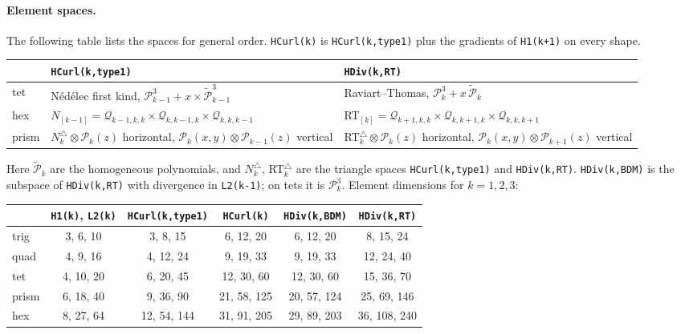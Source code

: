 \documentclass[10pt,a4paper]{article}
\newcommand{\code}[1]{\texttt{#1}}
\newcommand{\Pp}{\mathcal P}\newcommand{\Qq}{\mathcal Q}
\begin{document}
\paragraph{Element spaces.}
The following table lists the spaces for general order. \code{HCurl(k)} is \code{HCurl(k,type1)} plus the gradients of \code{H1(k+1)} on every shape.
\begin{center}\small
\renewcommand{\arraystretch}{1.15}
\begin{tabular}{@{}l>{\raggedright}p{7.0cm}>{\raggedright\arraybackslash}p{8.0cm}@{}}\toprule
 & \code{HCurl(k,type1)} & \code{HDiv(k,RT)}\\\midrule
tet & N\'ed\'elec first kind, $\Pp_{k-1}^3 + x\times\tilde{\Pp}_{k-1}^3$ & Raviart--Thomas, $\Pp_k^3+x\,\tilde{\Pp}_k$\\
hex & $N_{[k-1]} = \Qq_{k-1,k,k}\times\Qq_{k,k-1,k}\times\Qq_{k,k,k-1}$ & RT$_{[k]}=\Qq_{k+1,k,k}\times\Qq_{k,k+1,k}\times\Qq_{k,k,k+1}$\\
prism & $N^{\triangle}_k\otimes\Pp_k(z)$ horizontal, $\Pp_k(x,y)\otimes\Pp_{k-1}(z)$ vertical & RT$^{\triangle}_k\otimes\Pp_k(z)$ horizontal, $\Pp_k(x,y)\otimes\Pp_{k+1}(z)$ vertical\\\bottomrule
\end{tabular}
\end{center}
Here $\tilde{\Pp}_k$ are the homogeneous polynomials, and $N^\triangle_k$, RT$^\triangle_k$ are the triangle spaces \code{HCurl(k,type1)} and \code{HDiv(k,RT)}.
\code{HDiv(k,BDM)} is the subspace of \code{HDiv(k,RT)} with divergence in \code{L2(k-1)}; on tets it is $\Pp_k^3$.
Element dimensions for $k=1,2,3$:
\begin{center}\small
\begin{tabular}{@{}lccccc@{}}\toprule
 & \code{H1(k)}, \code{L2(k)} & \code{HCurl(k,type1)} & \code{HCurl(k)} & \code{HDiv(k,BDM)} & \code{HDiv(k,RT)}\\\midrule
trig  & 3, 6, 10  & 3, 8, 15   & 6, 12, 20   & 6, 12, 20   & 8, 15, 24\\
quad  & 4, 9, 16  & 4, 12, 24  & 9, 19, 33   & 9, 19, 33   & 12, 24, 40\\
tet   & 4, 10, 20 & 6, 20, 45  & 12, 30, 60  & 12, 30, 60  & 15, 36, 70\\
prism & 6, 18, 40 & 9, 36, 90  & 21, 58, 125 & 20, 57, 124 & 25, 69, 146\\
hex   & 8, 27, 64 & 12, 54, 144& 31, 91, 205 & 29, 89, 203 & 36, 108, 240\\\bottomrule
\end{tabular}
\end{center}
\end{document}
